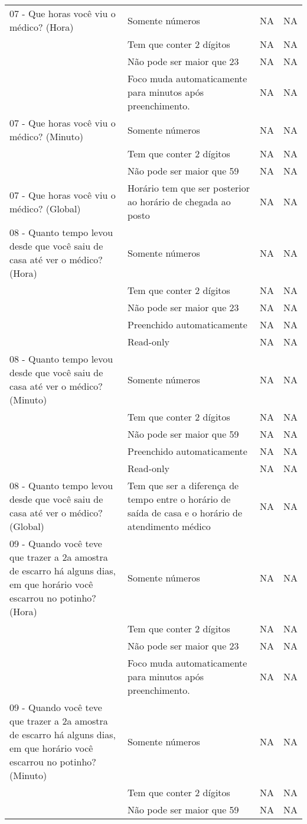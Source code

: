 \begin{longtable}{|p{}|p{}|p{}|p{}|}
07 - Que horas você viu o médico? (Hora) & Somente números & NA & NA \\ \cline{2-4}  & Tem que conter 2 dígitos & NA & NA \\ \cline{2-4} & Não pode ser maior que 23 & NA & NA \\ \cline{2-4} & Foco muda automaticamente para minutos após preenchimento.  & NA & NA \\ \hline
07 - Que horas você viu o médico? (Minuto) & Somente números & NA & NA \\ \cline{2-4}  & Tem que conter 2 dígitos & NA & NA \\ \cline{2-4} & Não pode ser maior que 59 & NA & NA \\ \hline
07 - Que horas você viu o médico? (Global) & Horário tem que ser posterior ao horário de chegada ao posto & NA & NA \\ \hline

08 - Quanto tempo levou desde que você saiu de casa até ver o médico? (Hora) & Somente números & NA & NA \\ \cline{2-4}  & Tem que conter 2 dígitos & NA & NA \\ \cline{2-4} & Não pode ser maior que 23 & NA & NA \\ \cline{2-4} & Preenchido automaticamente  & NA & NA \\ \cline{2-4} & Read-only & NA & NA \\ \hline
08 - Quanto tempo levou desde que você saiu de casa até ver o médico? (Minuto) & Somente números & NA & NA \\ \cline{2-4}  & Tem que conter 2 dígitos & NA & NA \\ \cline{2-4} & Não pode ser maior que 59 & NA & NA \\ \cline{2-4} & Preenchido automaticamente  & NA & NA \\ \cline{2-4} & Read-only & NA & NA \\ \hline 
08 - Quanto tempo levou desde que você saiu de casa até ver o médico? (Global) & Tem que ser a diferença de tempo entre o horário de saída de casa e o horário de atendimento médico & NA & NA \\ \hline 

09 - Quando você teve que trazer a 2a amostra de escarro há alguns dias, em que horário você escarrou no potinho? (Hora) & Somente números & NA & NA \\ \cline{2-4}  & Tem que conter 2 dígitos & NA & NA \\ \cline{2-4} & Não pode ser maior que 23 & NA & NA \\ \cline{2-4} & Foco muda automaticamente para minutos após preenchimento.  & NA & NA \\ \hline
09 - Quando você teve que trazer a 2a amostra de escarro há alguns dias, em que horário você escarrou no potinho? (Minuto) & Somente números & NA & NA \\ \cline{2-4}  & Tem que conter 2 dígitos & NA & NA \\ \cline{2-4} & Não pode ser maior que 59 & NA & NA \\ \hline


\end{longtable}

